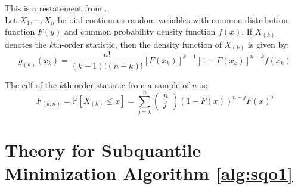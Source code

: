 \documentclass{article} %
\begin{document}
\begin{appendices}
	\begin{fact}
		This is a restatement from \cite{Wackerly2008}.\\
		Let $X_1,\cdots, X_n$ be i.i.d continuous random variables with common distribution function $F(y)$ and common probability density function $f(x)$. If $X_{(k)}$ denotes the $k$th-order statistic, then the density function of $X_{(k)}$ is given by:
		\begin{equation}
			g_{(k)}(x_k) = \frac{n!}{(k-1)!(n-k)!}[F(x_k)]^{k-1}[1 - F(x_k)]^{n-k}f(x_k)
		\end{equation}
	\end{fact}

	\begin{fact}
		The cdf of the $k$th order statistic from a sample of $n$ is:
		\begin{equation}
			F_{(k,n)} = \mathbb{P}\left[X_{(k)}\leq x \right] = \sum_{j=k}^n \begin{pmatrix} n \\ j\end{pmatrix} \left(1 - F(x)\right)^{n-j} F(x)^j
		\end{equation}
	\end{fact}

	\newpage
	\section{Theory for Subquantile Minimization Algorithm \ref{alg:sqo1}}\label{app:general-proofs}

\end{appendices}
\end{document}

